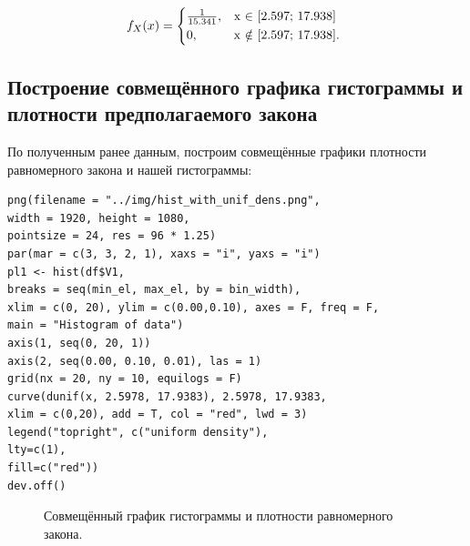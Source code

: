 \documentclass[14pt,a4paper]{scrartcl}
\begin{document}
\begin{equation*}
	f_X(x) = 
	\begin{cases*}
		\frac{1}{15.341}, & x $\in$ [2.597; 17.938]  \\
		0, & x $\notin$ [2.597; 17.938]. \\
	\end{cases*}
\end{equation*}

\subsection{Построение совмещённого графика гистограммы и плотности предполагаемого закона}
По полученным ранее данным, построим совмещённые графики плотности равномерного закона и нашей гистограммы:
\begin{lstlisting}
png(filename = "../img/hist_with_unif_dens.png", 
width = 1920, height = 1080,
pointsize = 24, res = 96 * 1.25)
par(mar = c(3, 3, 2, 1), xaxs = "i", yaxs = "i")
pl1 <- hist(df$V1,
breaks = seq(min_el, max_el, by = bin_width), 
xlim = c(0, 20), ylim = c(0.00,0.10), axes = F, freq = F,
main = "Histogram of data")
axis(1, seq(0, 20, 1))
axis(2, seq(0.00, 0.10, 0.01), las = 1)
grid(nx = 20, ny = 10, equilogs = F)
curve(dunif(x, 2.5978, 17.9383), 2.5978, 17.9383, 
xlim = c(0,20), add = T, col = "red", lwd = 3)
legend("topright", c("uniform density"), 
lty=c(1), 
fill=c("red"))
dev.off()
\end{lstlisting}


\begin{figure}[h]
	\caption{Совмещённый график гистограммы и плотности равномерного закона.}
	\label{ris:hist_with_unif_dens}
\end{figure}
\end{document}

